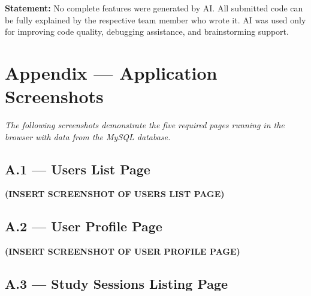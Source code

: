 \documentclass[11pt,a4paper]{article}
\begin{document}
\textbf{Statement:} No complete features were generated by AI. All submitted code can be fully explained by the respective team member who wrote it. AI was used only for improving code quality, debugging assistance, and brainstorming support.

\newpage

\appendix
\section{Appendix — Application Screenshots}

\textit{The following screenshots demonstrate the five required pages running in the browser with data from the MySQL database.}

\subsection{A.1 — Users List Page}


\textbf{(INSERT SCREENSHOT OF USERS LIST PAGE)}

\subsection{A.2 — User Profile Page}


\textbf{(INSERT SCREENSHOT OF USER PROFILE PAGE)}

\subsection{A.3 — Study Sessions Listing Page}

\end{document}
